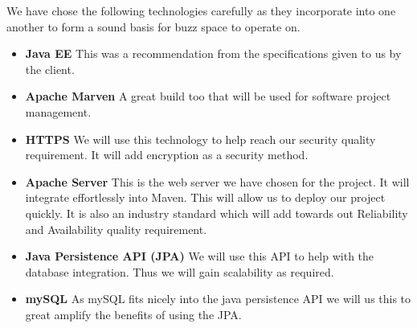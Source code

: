 We have chose the following technologies carefully as they incorporate into one another to form a sound basis for buzz space to operate on.

\begin{itemize}
	\item \textbf{Java EE}
		This was a recommendation from the specifications given to us by the client.
	\item \textbf{Apache Marven}
		A great build too that will be used for software project management.
	\item \textbf{HTTPS}
		We will use this technology to help reach our security quality requirement. It will add encryption as a security method.
	\item \textbf{Apache Server}
		This is the web server we have chosen for the project. It will integrate effortlessly into Maven. This will allow us to deploy our project quickly. It is also an industry standard which will add towards out Reliability and Availability quality requirement. 
	\item \textbf{Java Persistence API (JPA) }
		We will use this API to help with the database integration. Thus we will gain scalability as required.
	\item \textbf{mySQL}
		As mySQL fits nicely into the java persistence API we will us this to great amplify the benefits of using the JPA. 
\end{itemize}